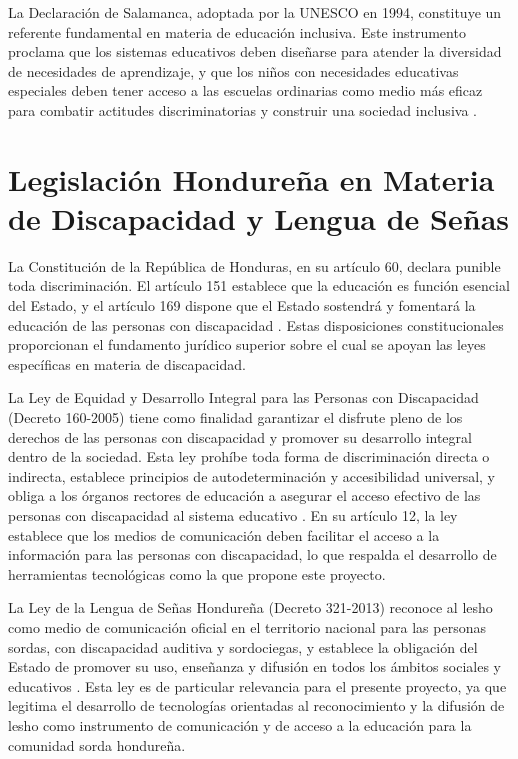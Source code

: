 La Declaración de Salamanca, adoptada por la UNESCO en 1994, constituye un referente
fundamental en materia de educación inclusiva. Este instrumento proclama que los sistemas
educativos deben diseñarse para atender la diversidad de necesidades de aprendizaje, y que
los niños con necesidades educativas especiales deben tener acceso a las escuelas ordinarias
como medio más eficaz para combatir actitudes discriminatorias y construir una sociedad
inclusiva \cite{unesco_salamanca_1994}.

\section{Legislación Hondureña en Materia de Discapacidad y Lengua de Señas}

La Constitución de la República de Honduras, en su artículo 60, declara punible toda
discriminación. El artículo 151 establece que la educación es función esencial del Estado,
y el artículo 169 dispone que el Estado sostendrá y fomentará la educación de las personas
con discapacidad \cite{constitucion_honduras_1982}. Estas disposiciones constitucionales
proporcionan el fundamento jurídico superior sobre el cual se apoyan las leyes específicas
en materia de discapacidad.

La Ley de Equidad y Desarrollo Integral para las Personas con Discapacidad (Decreto
160-2005) tiene como finalidad garantizar el disfrute pleno de los derechos de las personas
con discapacidad y promover su desarrollo integral dentro de la sociedad. Esta ley prohíbe
toda forma de discriminación directa o indirecta, establece principios de autodeterminación
y accesibilidad universal, y obliga a los órganos rectores de educación a asegurar el
acceso efectivo de las personas con discapacidad al sistema educativo \cite{decreto_160_2005}.
En su artículo 12, la ley establece que los medios de comunicación deben facilitar el
acceso a la información para las personas con discapacidad, lo que respalda el desarrollo
de herramientas tecnológicas como la que propone este proyecto.

La Ley de la Lengua de Señas Hondureña (Decreto 321-2013) reconoce al \acrshort{lesho} como medio de
comunicación oficial en el territorio nacional para las personas sordas, con discapacidad
auditiva y sordociegas, y establece la obligación del Estado de
promover su uso, enseñanza y difusión en todos los ámbitos sociales y educativos
\cite{congreso_decreto_2013}. Esta ley es de particular relevancia para el presente
proyecto, ya que legitima el desarrollo de tecnologías orientadas al reconocimiento y la
difusión de \acrshort{lesho} como instrumento de comunicación y de acceso a la educación para la
comunidad sorda hondureña.

